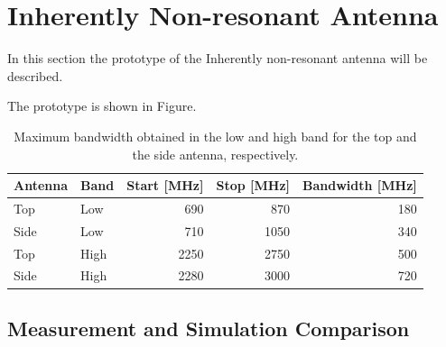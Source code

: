 \section{Inherently Non-resonant Antenna}
In this section the prototype of the Inherently non-resonant antenna will be described.

The prototype is shown in Figure. 

   \begin{table}
      \centering
      \begin{tabular}{|l|l|r|r|r|}
        \hline
        Antenna & Band & Start [MHz] & Stop [MHz] & Bandwidth [MHz] \\
        \hline
        Top     & Low  & 690        & 870       & 180 \\
        Side    & Low  & 710         & 1050        & 340 \\
        \hline
        Top     & High & 2250        & 2750       & 500 \\
        Side    & High & 2280        & 3000       & 720 \\
        \hline
      \end{tabular}
      \caption{Maximum bandwidth obtained in the low and high band for the top and the side antenna, respectively.}
      \label{tab:bw_sol3_proto}
    \end{table}

\subsection{Measurement and Simulation Comparison}



